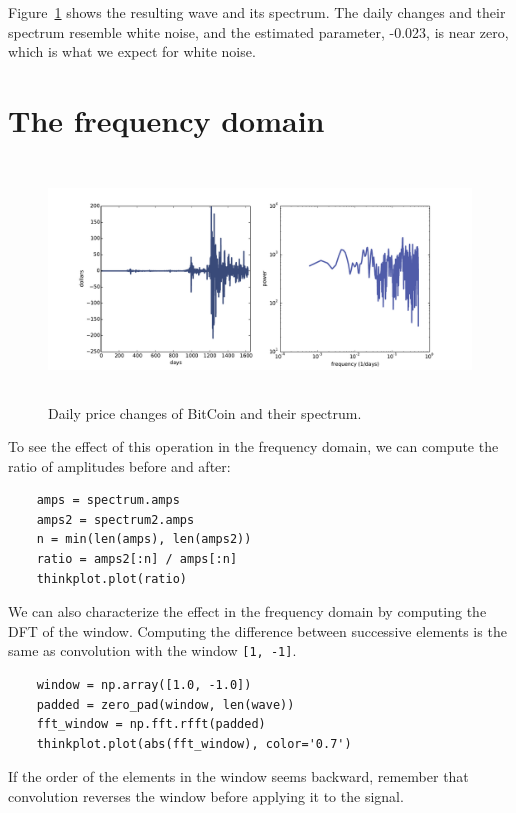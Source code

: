 \documentclass[12pt]{book}
\begin{document}
Figure~\ref{fig.diff_int2} shows the resulting wave and its
spectrum.  The daily changes and their spectrum resemble white noise,
and the estimated parameter, -0.023, is near zero, which is what
we expect for white noise.


\section{The frequency domain}

\begin{figure}
\centerline{\includegraphics[height=2.5in]{figs/systems2.pdf}}
\caption{Daily price changes of BitCoin and their spectrum.}
\label{fig.diff_int2}
\end{figure}

To see the effect of this operation in the frequency domain,
we can compute the ratio of amplitudes before and after:

\begin{verbatim}
    amps = spectrum.amps
    amps2 = spectrum2.amps
    n = min(len(amps), len(amps2))
    ratio = amps2[:n] / amps[:n]
    thinkplot.plot(ratio)
\end{verbatim}

We can also characterize the effect in the frequency domain
by computing the DFT of the window.  Computing the difference
between successive elements is the same as convolution with
the window {\tt [1, -1]}.

\begin{verbatim}
    window = np.array([1.0, -1.0])
    padded = zero_pad(window, len(wave))
    fft_window = np.fft.rfft(padded)
    thinkplot.plot(abs(fft_window), color='0.7')
\end{verbatim}

If the order of the elements in the window seems backward,
remember that convolution reverses the window before applying it
to the signal.
\end{document}
